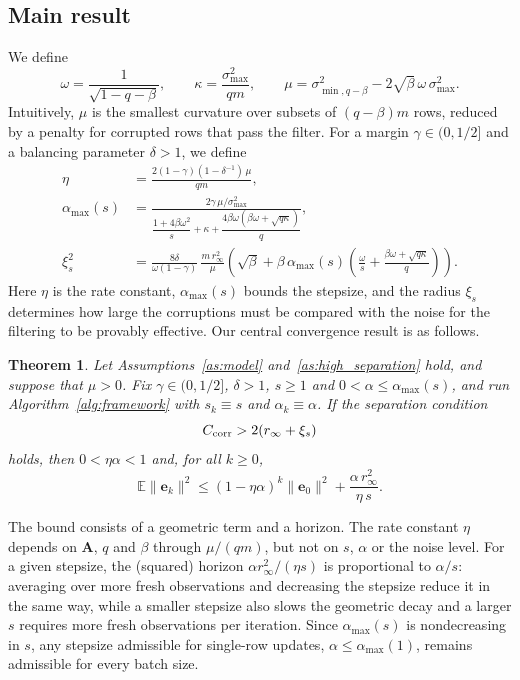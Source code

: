 \documentclass[pdflatex,sn-mathphys-num]{sn-jnl}
\theoremstyle{thmstyleone}
\newtheorem{thm}{Theorem}
\theoremstyle{thmstylethree}
\newcommand{\mA}{\mathbf{A}}
\newcommand{\ve}{\mathbf{e}}
\begin{document}
 \subsection{Main result}
\label{subsec:main_result}
We define
\[
\omega=\frac{1}{\sqrt{1-q-\beta}},\qquad
\kappa=\frac{\sigma_{\max}^2}{qm},\qquad
\mu=\sigma_{\min,q-\beta}^2-2\sqrt\beta\,\omega\,\sigma_{\max}^2 .
\]
Intuitively, $\mu$ is the smallest curvature over subsets of $(q-\beta)m$
rows, reduced by a penalty for corrupted rows that pass the filter. For a
margin $\gamma\in(0,1/2]$ and a balancing parameter $\delta>1$, we define
\begin{equation}
\label{eq:main_constants}
\begin{aligned}
\eta&=\frac{2(1-\gamma)(1-\delta^{-1})\,\mu}{qm},\\
\alpha_{\max}(s)&=\frac{2\gamma\,\mu/\sigma_{\max}^2}
{\dfrac{1+4\beta\omega^2}{s}+\kappa
+\dfrac{4\beta\omega(\beta\omega+\sqrt{q\kappa})}{q}},\\
\xi_s^2&=\frac{8\delta}{\omega(1-\gamma)}\,\frac{m\,r_\infty^2}{\mu}
\left(\sqrt\beta+\beta\,\alpha_{\max}(s)
\left(\frac{\omega}{s}+\frac{\beta\omega+\sqrt{q\kappa}}{q}\right)\right).
\end{aligned}
\end{equation}
Here $\eta$ is the rate constant, $\alpha_{\max}(s)$ bounds the stepsize, and
the radius $\xi_s$ determines how large the corruptions must be compared with
the noise for the filtering to be provably effective. Our central
convergence result is as follows.

\begin{thm}
\label{thm:main}
Let Assumptions~\ref{as:model} and~\ref{as:high_separation} hold, and suppose
that $\mu>0$. Fix $\gamma\in(0,1/2]$, $\delta>1$, $s\ge1$ and
$0<\alpha\le\alpha_{\max}(s)$, and run Algorithm~\ref{alg:framework} with
$s_k\equiv s$ and $\alpha_k\equiv\alpha$. If the separation condition
\begin{equation}
\label{eq:separation}
C_{\rm corr}>2(r_\infty+\xi_s)
\end{equation}
holds, then $0<\eta\alpha<1$ and, for all $k\ge0$,
\[
\mathbb E\|\ve_k\|^2
\le(1-\eta\alpha)^k\|\ve_0\|^2+\frac{\alpha\,r_\infty^2}{\eta\,s}.
\]
\end{thm}

The bound consists of a geometric term and a horizon. The rate constant
$\eta$ depends on $\mA$, $q$ and $\beta$ through $\mu/(qm)$, but not on $s$,
$\alpha$ or the noise level. For a given stepsize, the (squared) horizon
$\alpha r_\infty^2/(\eta s)$ is proportional to $\alpha/s$: averaging over
more fresh observations and decreasing the stepsize reduce it in the same
way, while a smaller stepsize also slows the geometric decay and a larger $s$
requires more fresh observations per iteration. Since $\alpha_{\max}(s)$ is
nondecreasing in $s$, any stepsize admissible for single-row updates,
$\alpha\le\alpha_{\max}(1)$, remains admissible for every batch size.
\end{document}
